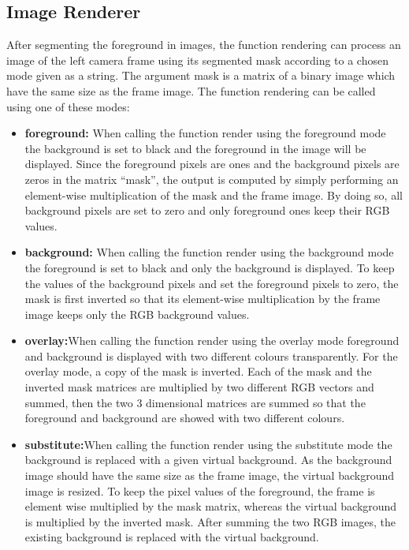 \subsection{Image Renderer}
After segmenting the foreground in images, the function rendering can process an image of the left camera frame using its segmented mask according to a chosen mode given as a string. The argument mask is a matrix of a binary image which have the same size as the frame image. The function rendering can be called using one of these modes:
\\
\begin{itemize}
  \item \textbf{foreground:} When calling the function render using the foreground mode the background is set to black and the foreground in the image will be displayed. Since the foreground pixels are ones and the background pixels are zeros in the matrix “mask”, the output is computed by simply performing an element-wise multiplication of the mask and the frame image. By doing so, all background pixels are set to zero and only foreground ones keep their RGB values.
  \item \textbf{background:} When calling the function render using the background mode the foreground is set to black and only the background is displayed. To keep the values of the background pixels and set the foreground pixels to zero, the mask is first inverted so that its element-wise multiplication by the frame image keeps only the RGB background values.
  \item \textbf{overlay:}When calling the function render using the overlay mode foreground and background is displayed with two different colours transparently. For the overlay mode, a copy of the mask is inverted. Each of the mask and the inverted mask matrices are multiplied by two different RGB vectors and summed, then the two 3 dimensional matrices are summed so that the foreground and background are showed with two different colours.
  \item \textbf{substitute:}When calling the function render using the substitute mode the background is replaced with a given virtual background. As the background image should have the same size as the frame image, the virtual background image is resized. To keep the pixel values of the foreground, the frame is element wise multiplied by the mask matrix, whereas the virtual background is multiplied by the inverted mask. After summing the two RGB images, the existing background is replaced with the virtual background.
\end{itemize}